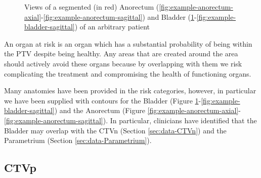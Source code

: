 \documentclass[11pt,twoside]{report}
\begin{document}
\begin{figure}[H]
{    \label{fig:example-bladder-axial}
  }
  \caption{Views of a segmented (in red) Anorectum (\ref{fig:example-anorectum-axial}-\ref{fig:example-anorectum-sagittal}) and Bladder (\ref{fig:example-bladder-axial}-\ref{fig:example-bladder-sagittal}) of an arbitrary patient}
\end{figure}

An organ at risk is an organ which has a substantial probability of being within the PTV despite being healthy. Any areas that are created around the area should actively avoid these organs because by overlapping with them we risk complicating the treatment and compromising the health of functioning organs.

Many anatomies have been provided in the risk categories, however, in particular we have been supplied with contours for the Bladder (Figure \ref{fig:example-bladder-axial}-\ref{fig:example-bladder-sagittal}) and the Anorectum (Figure \ref{fig:example-anorectum-axial}-\ref{fig:example-anorectum-sagittal}). In particular, clinicians have identified that the Bladder may overlap with the CTVn (Section \ref{sec:data-CTVn}) and the Parametrium (Section \ref{sec:data-Parametrium}). 

\subsection{CTVp}\label{sec:data-CTVp}
\end{document}
